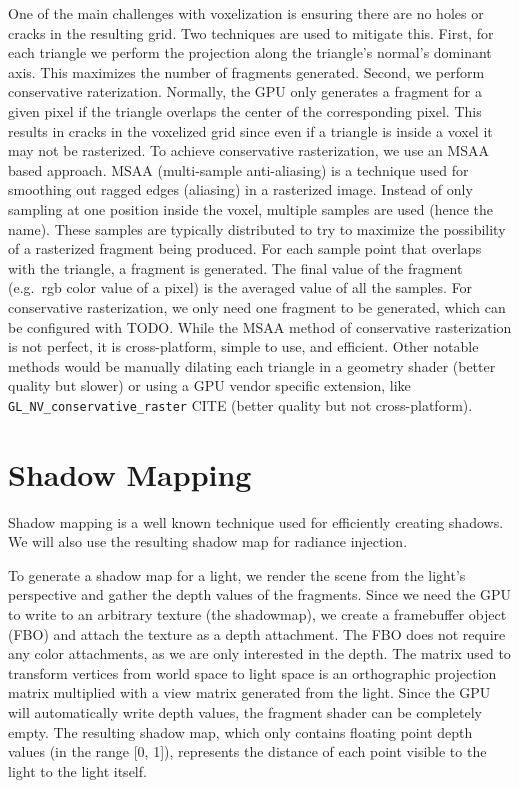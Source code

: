 One of the main challenges with voxelization is ensuring there are no holes or cracks in the resulting grid. Two techniques are used to mitigate this. First, for each triangle we perform the projection along the triangle's normal's dominant axis. This maximizes the number of fragments generated. Second, we perform conservative raterization. Normally, the GPU only generates a fragment for a given pixel if the triangle overlaps the center of the corresponding pixel. This results in cracks in the voxelized grid since even if a triangle is inside a voxel it may not be rasterized. To achieve conservative rasterization, we use an MSAA based approach. MSAA (multi-sample anti-aliasing) is a technique used for smoothing out ragged edges (aliasing) in a rasterized image. Instead of only sampling at one position inside the voxel, multiple samples are used (hence the name). These samples are typically distributed to try to maximize the possibility of a rasterized fragment being produced. For each sample point that overlaps with the triangle, a fragment is generated. The final value of the fragment (e.g.\ rgb color value of a pixel) is the averaged value of all the samples. For conservative rasterization, we only need one fragment to be generated, which can be configured with TODO. While the MSAA method of conservative rasterization is not perfect, it is cross-platform, simple to use, and efficient. Other notable methods would be manually dilating each triangle in a geometry shader (better quality but slower) or using a GPU vendor specific extension, like \verb#GL_NV_conservative_raster# CITE (better quality but not cross-platform).


\section{Shadow Mapping}
Shadow mapping is a well known technique used for efficiently creating shadows. We will also use the resulting shadow map for radiance injection.

To generate a shadow map for a light, we render the scene from the light's perspective and gather the depth values of the fragments. Since we need the GPU to write to an arbitrary texture (the shadowmap), we create a framebuffer object (FBO) and attach the texture as a depth attachment. The FBO does not require any color attachments, as we are only interested in the depth. The matrix used to transform vertices from world space to light space is an orthographic projection matrix multiplied with a view matrix generated from the light. Since the GPU will automatically write depth values, the fragment shader can be completely empty. The resulting shadow map, which only contains floating point depth values (in the range [0, 1]), represents the distance of each point visible to the light to the light itself.

